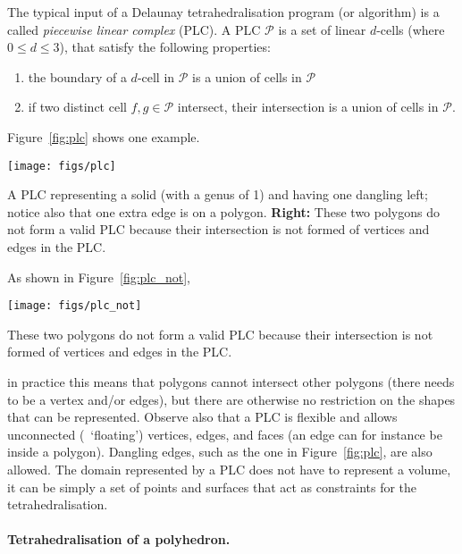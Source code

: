 The typical input of a Delaunay tetrahedralisation program (or algorithm) is a called \emph{piecewise linear complex} (PLC).
A PLC $\mathcal{P}$ is a set of linear $d$-cells (where $0 \leq d \leq 3$), that satisfy the following properties:
\begin{enumerate}
  \item the boundary of a $d$-cell in $\mathcal{P}$ is a union of cells in $\mathcal{P}$
  \item if two distinct cell $f, g \in \mathcal{P}$ intersect, their intersection is a union of cells in $\mathcal{P}$.
\end{enumerate}
Figure~\ref{fig:plc} shows one example.
\begin{marginfigure}
  \centering
  \texttt{[image: figs/plc]}
  \caption[A PLC representing a solid]{A PLC representing a solid (with a genus of 1) and having one dangling left; notice also that one extra edge is on a polygon. \textbf{Right:} These two polygons do not form a valid PLC because their intersection is not formed of vertices and edges in the PLC.}%
\label{fig:plc}
\end{marginfigure}
As shown in Figure~\ref{fig:plc_not}, 
\begin{marginfigure}
  \centering
  \texttt{[image: figs/plc\_not]}
  \caption[Two polygons that do not form a valid PLC]{These two polygons do not form a valid PLC because their intersection is not formed of vertices and edges in the PLC.}%
\label{fig:plc_not}
\end{marginfigure}
in practice this means that polygons cannot intersect other polygons (there needs to be a vertex and/or edges), but there are otherwise no restriction on the shapes that can be represented.
Observe also that a PLC is flexible and allows unconnected (\ie\ `floating') vertices, edges, and faces (an edge can for instance be inside a polygon).
Dangling edges, such as the one in Figure~\ref{fig:plc}, are also allowed.
The domain represented by a PLC does not have to represent a volume, it can be simply a set of points and surfaces that act as constraints for the tetrahedralisation.

\paragraph*{Tetrahedralisation of a polyhedron.}

